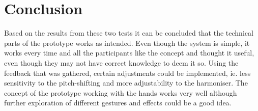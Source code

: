 \section{Conclusion}
Based on the results from these two tests it can be concluded that the technical parts of the prototype works as intended. Even though the system is simple, it works every time and all the participants like the concept and thought it useful, even though they may not have correct knowledge to deem it so. Using the feedback that was gathered, certain adjustments could be implemented, ie. less sensitivity to the pitch-shifting and more adjustability to the harmoniser. The concept of the prototype working with the hands works very well although further exploration of different gestures and effects could be a good idea. 


